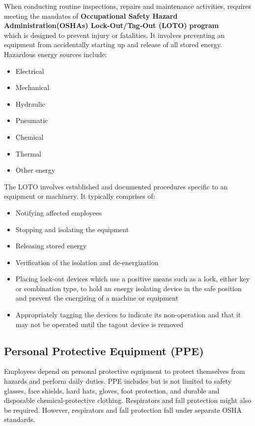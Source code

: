 When conducting routine inspections, repairs and maintenance activities, requires meeting the mandates of \textbf{Occupational Safety  Hazard Administration(OSHAs) Lock-Out/Tag-Out (LOTO) program}\\
which is designed to prevent injury or fatalities.  It involves preventing an equipment from accidentally starting up and release of all stored energy.  Hazardous energy sources include: 
\begin{itemize}
\item Electrical 
\item Mechanical
\item Hydraulic
\item Pneumatic 
\item Chemical 
\item Thermal  
\item Other energy
\end{itemize}

The LOTO involves established and documented procedures specific to an equipment or machinery.  It typically comprises of:\\
\begin{itemize}
\item Notifying affected employees
\item Stopping and isolating the equipment
\item Releasing stored energy
\item Verification of the isolation and de-energization
\item Placing lock-out devices which use a positive means such as a lock, either key or combination type, to hold an energy isolating device in the safe position and prevent the energizing of a machine or equipment
\item Appropriately tagging the devices to indicate its non-operation and that it may not be operated until the tagout device is removed
\end{itemize}

\subsection{Personal Protective Equipment (PPE)}
Employees depend on personal protective equipment to protect themselves from hazards and perform daily duties. PPE includes but is not limited to safety glasses, face shields, hard hats, gloves, foot protection, and durable and disposable chemical-protective clothing. Respirators and fall protection might also be required. However, respirators and fall protection fall under separate OSHA standards. \\

